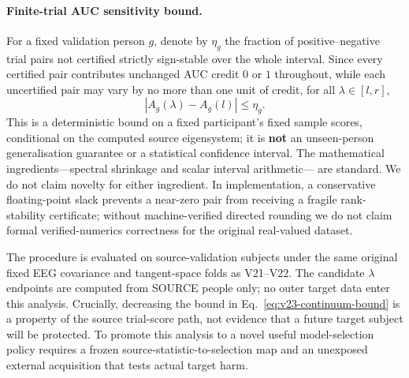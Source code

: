 \paragraph{Finite-trial AUC sensitivity bound.}
For a fixed validation person $g$, denote by $\eta_g$
the fraction of positive--negative trial pairs not certified
strictly sign-stable over the whole interval. Since every
certified pair contributes unchanged AUC credit $0$ or $1$
throughout, while each uncertified pair may vary by no more
than one unit of credit, for all $\lambda\in[l,r]$,
\begin{equation}
 \left|A_g(\lambda)-A_g(l)\right|\le\eta_g.
 \label{eq:v23-continuum-bound}
\end{equation}
This is a deterministic bound on a fixed participant's fixed
sample scores, conditional on the computed source eigensystem;
it is \textbf{not} an unseen-person generalisation guarantee
or a statistical confidence interval. The mathematical
ingredients---spectral shrinkage and scalar interval arithmetic---
are standard. We do not claim novelty for either ingredient.
In implementation, a conservative floating-point
slack prevents a near-zero pair from receiving a fragile
rank-stability certificate; without machine-verified directed
rounding we do not claim formal verified-numerics correctness
for the original real-valued dataset.

The procedure is evaluated on source-validation subjects
under the same original fixed EEG covariance and
tangent-space folds as V21--V22. The candidate $\lambda$
endpoints are computed from SOURCE people only; no outer
target data enter this analysis. Crucially, decreasing
the bound in Eq.~\eqref{eq:v23-continuum-bound}
is a property of the source trial-score path, not evidence
that a future target subject will be protected. To promote
this analysis to a novel useful model-selection policy
requires a frozen source-statistic-to-selection map and an
unexposed external acquisition that tests actual target harm.
